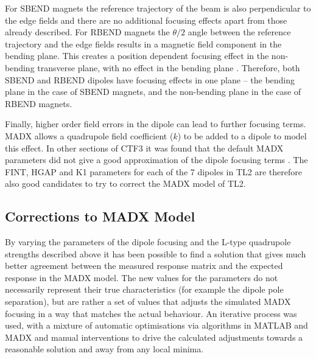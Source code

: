 
For SBEND magnets the reference trajectory of the beam is also perpendicular to the edge fields and there are no additional focusing effects apart from those already described. For RBEND magnets the \(\theta/2\) angle between the reference trajectory and the edge fields results in a magnetic field component in the bending plane. This creates a position dependent focusing effect in the non-bending transverse plane, with no effect in the bending plane \cite{mackay}. Therefore, both SBEND and RBEND dipoles have focusing effects in one plane -- the bending plane in the case of SBEND magnets, and the non-bending plane in the case of RBEND magnets.

Finally, higher order field errors in the dipole can lead to further focusing terms. MADX allows a quadrupole field coefficient (\(k\)) to be added to a dipole to model this effect. In other sections of CTF3 it was found that the default MADX parameters did not give a good approximation of the dipole focusing terms \cite{benOptics}. The FINT, HGAP and K1 parameters for each of the 7 dipoles in TL2 are therefore also good candidates to try to correct the  MADX model of TL2.

\subsection{Corrections to MADX Model}
\label{ss:modelCorrections}

By varying the parameters of the dipole focusing and the L-type quadrupole strengths described above it has been possible to find a solution that gives much better agreement between the measured response matrix and the expected response in the MADX model. The new values for the parameters do not necessarily represent their true characteristics (for example the dipole pole separation), but are rather a set of values that adjusts the simulated MADX focusing in a way that matches the actual behaviour. An iterative process was used, with a mixture of automatic optimisations via algorithms in MATLAB and MADX and manual interventions to drive the calculated adjustments towards a reasonable solution and away from any local minima.

